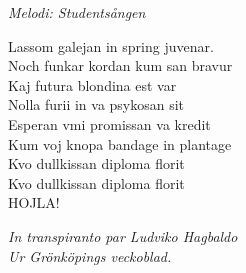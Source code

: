 {\footnotesize\textit{Melodi: Studentsången}}\par
\vspace{10pt}
Lassom galejan in spring juvenar.\\
Noch funkar kordan kum san bravur\\
Kaj futura blondina est var\\
Nolla furii in va psykosan sit\\
Esperan vmi promissan va kredit\\
Kum voj knopa bandage in plantage\\
Kvo dullkissan diploma florit\\
Kvo dullkissan diploma florit\\
HOJLA!\par
\vspace{10pt}
{\footnotesize\textit{In transpiranto par Ludviko Hagbaldo\\ Ur
    Grönköpings veckoblad.}}
